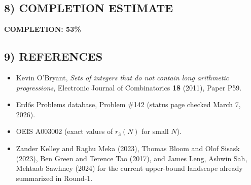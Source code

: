 \subsection*{8) COMPLETION ESTIMATE}
\textbf{COMPLETION: 53\%}

\subsection*{9) REFERENCES}
\begin{itemize}
\item Kevin O'Bryant, \emph{Sets of integers that do not contain long arithmetic progressions}, Electronic Journal of Combinatorics \textbf{18} (2011), Paper P59.
\item Erd\H{o}s Problems database, Problem \#142 (status page checked March 7, 2026).
\item OEIS A003002 (exact values of $r_3(N)$ for small $N$).
\item Zander Kelley and Raghu Meka (2023), Thomas Bloom and Olof Sisask (2023), Ben Green and Terence Tao (2017), and James Leng, Ashwin Sah, Mehtaab Sawhney (2024) for the current upper-bound landscape already summarized in Round-1.
\end{itemize}
